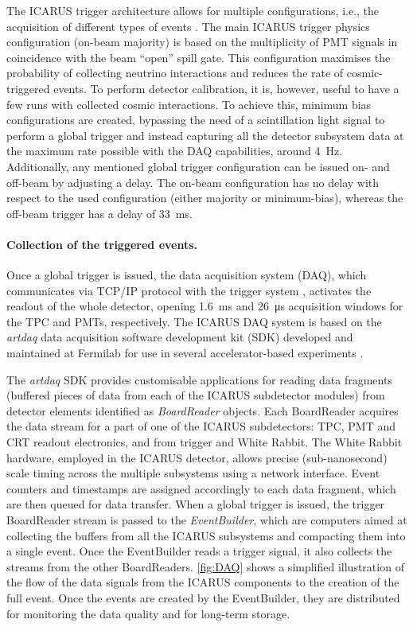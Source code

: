 The ICARUS trigger architecture allows for multiple configurations, i.e., the acquisition of different types of events \cite{ICARUS:2025kai}. The main ICARUS trigger physics configuration (on-beam majority) is based on the multiplicity of PMT signals in coincidence with the beam ``open'' spill gate. This configuration maximises the probability of collecting neutrino interactions and reduces the rate of cosmic-triggered events. To perform detector calibration, it is, however, useful to have a few runs with collected cosmic interactions. To achieve this, minimum bias configurations are created, bypassing the need of a scintillation light signal to perform a global trigger and instead capturing all the detector subsystem data at the maximum rate possible with the DAQ capabilities, around \SI{4}{\hertz}. Additionally, any mentioned global trigger configuration can be issued on- and off-beam by adjusting a delay. The on-beam configuration has no delay with respect to the used configuration (either majority or minimum-bias), whereas the off-beam trigger has a delay of \SI{+33}{\ms}. 

\paragraph{Collection of the triggered events. } Once a global trigger is issued, the data acquisition system (DAQ), which communicates via TCP/IP protocol with the trigger system \cite{ICARUS:2025kai}, activates the readout of the whole detector, opening \SI{1.6}{\ms} and \SI{26}{\us} acquisition windows for the TPC and PMTs, respectively. The ICARUS DAQ system is based on the \emph{artdaq} data acquisition software development kit (SDK) developed and maintained at Fermilab for use in several accelerator-based experiments \cite{Biery:2013cda}.  

The \emph{artdaq} SDK provides  customisable applications for reading data fragments (buffered pieces of data from each of the ICARUS subdetector modules) from detector elements identified as \emph{BoardReader} objects. Each BoardReader acquires the data stream for a part of one of the ICARUS subdetectors: TPC, PMT and CRT readout electronics, and from trigger and White Rabbit. 
The White Rabbit hardware, employed in the ICARUS detector, allows precise (sub-nanosecond) scale timing across the multiple subsystems using a network interface. 
Event counters and timestamps are assigned accordingly to each data fragment, which are then queued for data transfer. 
When a global trigger is issued, the trigger BoardReader stream is passed to the \emph{EventBuilder}, which are computers aimed at collecting the buffers from all the ICARUS subsystems and compacting them into a single event. Once the EventBuilder reads a trigger signal, it also collects the streams from the other BoardReaders.  \autoref{fig:DAQ} shows a simplified illustration of the flow of the data signals from the ICARUS components to the creation of the full event. Once the events are created by the EventBuilder, they are distributed for monitoring the data quality and for long-term storage. 

